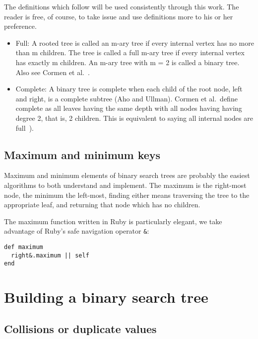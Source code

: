 The definitions which follow will be used consistently through this
work. The reader is free, of course, to take issue and use definitions
more to his or her preference.

\begin{itemize}
  \item Full: A rooted tree is called an m-ary tree if every internal
    vertex has no more than m children. The tree is called a full m-ary
    tree if every internal vertex has exactly m children. An m-ary tree
    with m = 2 is called a binary tree.~\cite[p. 748]{rosen} Also see
    Cormen et al.~\cite[p. 1178]{cormen:th2009}.

  \item Complete: A binary tree is complete when each child of the root node,
    left and right, is a complete subtree (Aho and Ullman). Cormen et al.\
    define complete as all leaves having the same depth with all nodes having
    having degree 2, that is, 2 children. This is equivalent to saying all
    internal nodes are full~\cite[p. 1179]{cormen:th2009}).
\end{itemize}

\subsection{Maximum and minimum keys}

\setcounter{sno}{0}

\sno Maximum and minimum elements of binary search trees are probably the easiest
algorithms to both understand and implement. \sno The maximum is the right-most
node, the minimum the left-most, finding either means traversing the tree
to the appropriate leaf, and returning that node which has no children.

\sno The maximum function written in Ruby is particularly elegant,
we take advantage of Ruby's safe navigation operator {\tt \&}:

\begin{lstlisting}[frame=none]
def maximum
  right&.maximum || self
end
\end{lstlisting}


\section{Building a binary search tree}

\subsection{Collisions or duplicate values}


